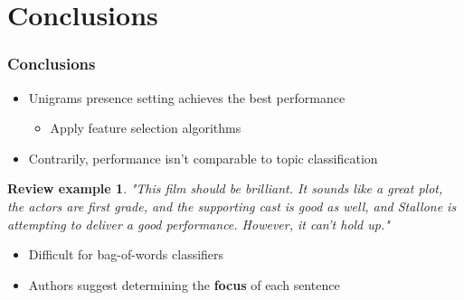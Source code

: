 \documentclass{beamer}
\newtheorem{snt}{Review example}
\begin{document}
\section{Conclusions}
\begin{frame}
	\frametitle{Conclusions}
	\begin{itemize}
		\item Unigrams presence setting achieves the best performance
		\begin{itemize}
			\item Apply feature selection algorithms
		\end{itemize}
		\item Contrarily, performance isn't comparable to topic classification 
	\end{itemize}
	
	\begin{snt}
		"This film should be brilliant. It sounds like a great plot, the actors are first grade, and the supporting cast is good as well, and Stallone is attempting to deliver a good performance. However, it can't hold up."
	\end{snt}
	\pause
	
	\begin{itemize}
		\item Difficult for bag-of-words classifiers
		\item Authors suggest determining the \textbf{focus} of each sentence
	\end{itemize}
\end{frame}
\end{document}
